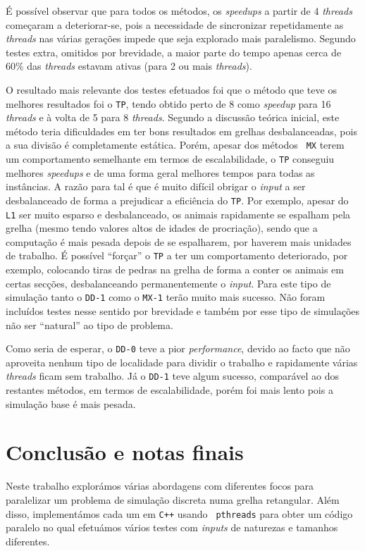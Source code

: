 \documentclass[10pt,a4paper,oneside]{article}
\begin{document}
É possível observar que para todos os métodos, os {\it speedups} a
partir de 4 {\it threads} começaram a deteriorar-se, pois a
necessidade de sincronizar repetidamente as {\it threads} nas várias
gerações impede que seja explorado mais paralelismo. Segundo testes
extra, omitidos por brevidade, a maior parte do tempo apenas cerca de
$60\%$ das {\it threads} estavam ativas (para 2 ou mais {\it
  threads}).

O resultado mais relevante dos testes efetuados foi que o método que
teve os melhores resultados foi o {\tt TP}, tendo obtido perto de 8
como {\it speedup} para 16 {\it threads} e à volta de 5 para 8 {\it
  threads}. Segundo a discussão teórica inicial, este método teria
dificuldades em ter bons resultados em grelhas desbalanceadas, pois a
sua divisão é completamente estática. Porém, apesar dos métodos {\tt
  MX} terem um comportamento semelhante em termos de escalabilidade, o
{\tt TP} conseguiu melhores {\it speedups} e de uma forma geral
melhores tempos para todas as instâncias. A razão para tal é que é
muito difícil obrigar o {\it input} a ser desbalanceado de forma a
prejudicar a eficiência do {\tt TP}. Por exemplo, apesar do {\tt L1}
ser muito esparso e desbalanceado, os animais rapidamente se espalham
pela grelha (mesmo tendo valores altos de idades de procriação), sendo
que a computação é mais pesada depois de se espalharem, por haverem
mais unidades de trabalho. É possível ``forçar'' o {\tt TP} a ter um
comportamento deteriorado, por exemplo, colocando tiras de pedras na
grelha de forma a conter os animais em certas secções, desbalanceando
permanentemente o {\it input}. Para este tipo de simulação tanto o
{\tt DD-1} como o {\tt MX-1} terão muito mais sucesso. Não foram
incluídos testes nesse sentido por brevidade e também por esse tipo de
simulações não ser ``natural'' ao tipo de problema.

Como seria de esperar, o {\tt DD-0} teve a pior {\it performance},
devido ao facto que não aproveita nenhum tipo de localidade para
dividir o trabalho e rapidamente várias {\it threads} ficam sem
trabalho. Já o {\tt DD-1} teve algum sucesso, comparável ao dos
restantes métodos, em termos de escalabilidade, porém foi mais lento
pois a simulação base é mais pesada.


\section{Conclusão e notas finais}
\label{sec:con}
Neste trabalho explorámos várias abordagens com diferentes focos para
paralelizar um problema de simulação discreta numa grelha
retangular. Além disso, implementámos cada um em {\tt C++} usando {\tt
  pthreads} para obter um código paralelo no qual efetuámos vários
testes com \textit{inputs} de naturezas e tamanhos diferentes.
\end{document}
